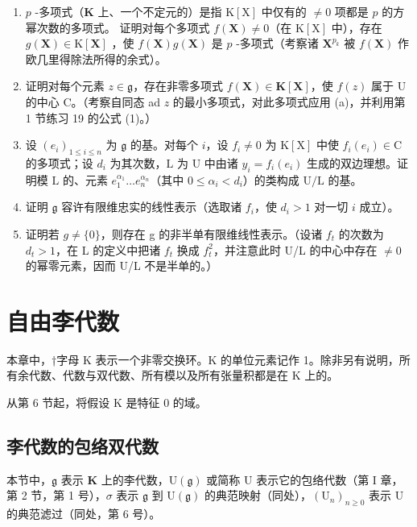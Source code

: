 \begin{enumerate}
\def\labelenumi{(\alph{enumi})}
\item
  \(p\) -多项式（\(\mathbf{K}\) 上、一个不定元的）是指 \(\mathrm{K}[\mathrm{X}]\) 中仅有的 \(\neq 0\) 项都是 \(p\) 的方幂次数的多项式。 证明对每个多项式 \(f(\mathbf{X}) \neq 0\)（在 \(\mathrm{K}[\mathrm{X}]\) 中），存在 \(g(\mathbf{X}) \in \mathrm{K}[\mathbf{X}]\) ，使 \(f(\mathbf{X})g(\mathbf{X})\) 是 \(p\) -多项式（考察诸 \(\mathbf{X}^{p_k}\) 被 \(f(\mathbf{X})\) 作欧几里得除法所得的余式）。
\item
  证明对每个元素 \(z \in \mathfrak{g}\)，存在非零多项式 \(f(\mathbf{X}) \in \mathbf{K}[\mathbf{X}]\)，使 \(f(z)\) 属于 U 的中心 C。（考察自同态 ad \(z\) 的最小多项式，对此多项式应用 (a)，并利用第 1 节练习 19 的公式 (1)。）
\item
  设 \((e_i)_{1\leqslant i\leqslant n}\) 为 \(\mathfrak{g}\) 的基。对每个 \(i\)，设 \(f_{i}\neq 0\) 为 \(\mathrm{K}[\mathrm{X}]\) 中使 \(f_{i}(e_{i})\in \mathrm{C}\) 的多项式；设 \(d_{i}\) 为其次数，\(\mathrm{L}\) 为 \(\mathrm{U}\) 中由诸 \(y_{i} = f_{i}(e_{i})\) 生成的双边理想。证明模 \(\mathrm{L}\) 的、元素 \(e_1^{\alpha_1}\ldots e_n^{\alpha_n}\)（其中 \(0\leqslant \alpha_{i} < d_{i}\)）的类构成 \(\mathrm{U / L}\) 的基。
\item
  证明 \(\mathfrak{g}\) 容许有限维忠实的线性表示（选取诸 \(f_{i}\)，使 \(d_{i} > 1\) 对一切 \(i\) 成立）。
\item
  证明若 \(g \neq \{0\}\)，则存在 g 的非半单有限维线性表示。（设诸 \(f_{t}\) 的次数为 \(d_{t} > 1\)，在 L 的定义中把诸 \(f_{t}\) 换成 \(f_{t}^{2}\)，并注意此时 U/L 的中心中存在 \(\neq 0\) 的幂零元素，因而 U/L 不是半单的。）
\end{enumerate}


\chapter{自由李代数}

本章中，†字母 K 表示一个非零交换环。K 的单位元素记作 1。除非另有说明，所有余代数、代数与双代数、所有模以及所有张量积都是在 K 上的。

从第 6 节起，将假设 K 是特征 0 的域。

\section{李代数的包络双代数}

本节中，\(\mathfrak{g}\) 表示 \(\mathbf{K}\) 上的李代数，\(\mathrm{U}(\mathfrak{g})\) 或简称 \(\mathrm{U}\) 表示它的包络代数（第 I 章，第 2 节，第 1 号），\(\sigma\) 表示 \(\mathfrak{g}\) 到 \(\mathrm{U}(\mathfrak{g})\) 的典范映射（同处），\((\mathrm{U}_n)_{n\geqslant 0}\) 表示 \(\mathrm{U}\) 的典范滤过（同处，第 6 号）。

